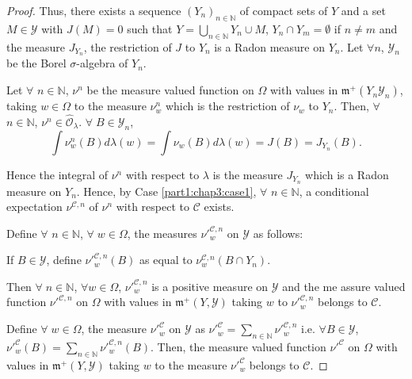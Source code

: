 \begin{proof}
Thus, there exists a sequence $(Y_n)_{n \in \mathbb{N}}$ of compact
sets of $Y$ and a set $M \in \mathscr{Y}$ with $J(M)=0$ such that $Y
=\bigcup\limits_{n \in \mathbb{N}} Y_n \cup M$, $Y_n \cap Y_m =
\emptyset$ if $n \neq m$ and the measure $J_{Y_n}$, the restriction of
$J$ to $Y_n$ is a Radon measure on $Y_n$. Let $\forall n $,
$\mathscr{Y}_n$ be the Borel $\sigma$-algebra of $Y_n$. 

Let $\forall$ $n \in \mathbb{N}$, $\nu^n$ be the measure valued
function on $\Omega$ with values in $\mathfrak{m}^+ (Y_n
\mathscr{Y}_n)$, taking $w \in \Omega$ to the measure $\nu^n_w$ which
is the restriction of $\nu_w$ to $Y_n$. Then, $\forall$ $n\in
\mathbb{N}$, $\nu^n \in\hat{\mathscr{O}}_\lambda$. $\forall \; B \in
\mathscr{Y}_n$, 
$$
\int \nu^n_w (B) d \lambda (w) = \int \nu_w (B) d \lambda (w) = J(B) = 
J_{Y_n} (B). 
$$\pageoriginale

Hence the integral of $\nu^n$ with respect to $\lambda$ is the measure
$J_{Y_n}$ which is a Radon measure on $Y_n$. Hence, by Case \ref{part1:chap3:case1},
$\forall$ $ n \in\mathbb{N}$, a conditional expectation
$\nu^{\mathscr{C},n}$ of $\nu^n$ with respect to $\mathscr{C}$
exists. 

Define $\forall $ $n \in\mathbb{N}$, $\forall \; w \in \Omega$, the
measures ${\nu'}^{\mathscr{C}, n}_w$ on $\mathscr{Y}$ as follows: 

If $B \in \mathscr{Y}$, define ${\nu'}^{\mathscr{C}, n}_w(B)$ as equal
to $\nu^{\mathscr{C},n}_w (B \cap Y_n)$. 

Then $\forall \; n \in\mathbb{N}$, $\forall w\in \Omega$,
${\nu'}^{\mathscr{C}, n}_w$ is a positive measure on $\mathscr{Y}$ and
the me assure valued function ${\nu'}^{\mathscr{C},n}$ on $\Omega$ with
values in $\mathfrak{m}^+(Y, \mathscr{Y})$ taking $w$ to
${\nu'}^{\mathscr{C}, n}_w$ belongs to $\mathscr{C}$. 

Define $\forall \; w \in \Omega$, the measure ${\nu'}^{\mathscr{C}}_w$
on $\mathscr{Y}$ as ${\nu'}^{\mathscr{C}}_w = \sum\limits_{n
  \in\mathbb{N}} {\nu'}^{\mathscr{C}, n}_w$ i.e. $\forall B \in
\mathscr{Y}$, ${\nu'}^\mathscr{C}_w(B) = \sum\limits_{n \in
  \mathbb{N}} {\nu'}^{\mathscr{C},n}_w(B)$. Then, the measure valued
function ${\nu'}^\mathscr{C}$ on $\Omega$ with values in
$\mathfrak{m}^+ (Y, \mathscr{Y})$ taking $w$ to the measure
${\nu'}^\mathscr{C}_w$ belongs to $\mathscr{C}$. 


\end{proof}
